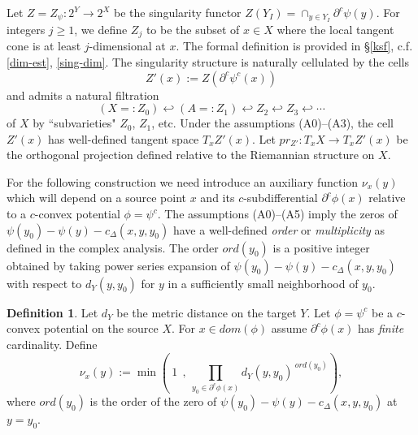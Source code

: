 \documentclass[12pt]{amsart}
\theoremstyle{definition}
\newtheorem{dfn}{Definition}
\theoremstyle{remark}
\newcommand{\bR}{\mathbb{R}}
\newcommand{\del}{\partial}
\newcommand{\ysub}{\del^c \psi(y)}
\newcommand{\hh}{\hookleftarrow}
\newcommand{\cd}{c_\Delta}
\begin{document}
Let $Z=Z_{\psi}: 2^Y \to 2^X$ be the singularity functor $Z(Y_I)=\cap_{y\in Y_I} \ysub$. For integers $j\geq 1$, we define $Z_j$ to be the subset of $x\in X$ where the local tangent cone is at least $j$-dimensional at $x$. The formal definition is provided in \S \ref{ksf}, c.f. \ref{dim-est}, \ref{sing-dim}. The singularity structure is naturally cellulated by the cells $$Z'(x):=Z(\del^c\psi^c(x))$$ and admits a natural filtration $$(X=:Z_0)\hh (A=:Z_1) \hh Z_2 \hh Z_3 \hh \cdots $$ of $X$ by ``subvarieties" $Z_0$, $Z_1$, etc. Under the assumptions (A0)--(A3), the cell $Z'(x)$ has well-defined tangent space $T_x Z'(x)$. Let $pr_{Z'}: T_x X \to T_x Z'(x)$ be the orthogonal projection defined relative to the Riemannian structure on $X$.  


For the following construction we need introduce an auxiliary function $\nu_x(y)$ which will depend on a source point $x$ and its $c$-subdifferential $\del^c \phi(x)$ relative to a $c$-convex potential $\phi=\psi^c$. The assumptions (A0)--(A5) imply the zeros of $\psi(y_0)-\psi(y) -\cd(x,y,y_0)$ have a well-defined \emph{order} or \emph{multiplicity} as defined in the complex analysis. The order $ord(y_0)$ is a positive integer obtained by taking power series expansion of $\psi(y_0)-\psi(y) -\cd(x,y,y_0)$ with respect to $d_Y(y,y_0)$ for $y$ in a sufficiently small neighborhood of $y_0$. 


\begin{dfn}\label{order}
Let $d_Y$ be the metric distance on the target $Y$. Let $\phi=\psi^c$ be a $c$-convex potential on the source $X$. For $x\in dom(\phi)$ assume $\del^c \phi(x)$ has \emph{finite} cardinality. Define \begin{equation}\label{nuorder}
\nu_x(y):=\min(~1~~,~\prod_{y_0 \in \del^c \phi(x)} d_Y(y,y_0)^{~ord(y_0)}),\end{equation} where $ord(y_0)$ is the order of the zero of $\psi(y_0)-\psi(y) -\cd(x,y,y_0)$ at $y=y_0$. 
\end{dfn}



















\end{document}
